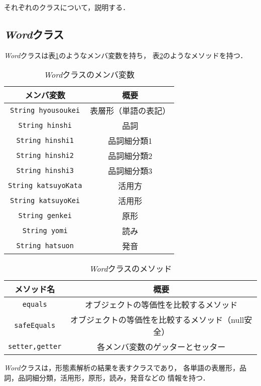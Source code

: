 \documentclass[a4paper,11pt,dvipdfmx]{jsarticle}
\begin{document}
それぞれのクラスについて，説明する．

\subsection{\textit{Word}クラス}
\textit{Word}クラスは表\ref{table:word_class_members}のようなメンバ変数を持ち，
表\ref{table:word_class_methods}のようなメソッドを持つ．

\begin{table}[H]
  \centering
  \caption{\textit{Word}クラスのメンバ変数}
  \label{table:word_class_members}
  \begin{tabular}{|c|c|}
    \hline
    メンバ変数 & 概要 \\
    \hline
    \texttt{String hyousoukei} & 表層形（単語の表記） \\
    \texttt{String hinshi} & 品詞 \\
    \texttt{String hinshi1} & 品詞細分類1 \\
    \texttt{String hinshi2} & 品詞細分類2 \\
    \texttt{String hinshi3} & 品詞細分類3 \\
    \texttt{String katsuyoKata} & 活用方 \\
    \texttt{String katsuyoKei} & 活用形 \\
    \texttt{String genkei} & 原形 \\
    \texttt{String yomi} & 読み \\
    \texttt{String hatsuon} & 発音 \\
  \hline
  \end{tabular}
\end{table}


\begin{table}[H]
\centering
\caption{\textit{Word}クラスのメソッド}
\label{table:word_class_methods}
\begin{tabular}{|c|c|}
\hline
メソッド名 & 概要 \\
\hline
\texttt{equals} & オブジェクトの等価性を比較するメソッド \\
\texttt{safeEquals} & オブジェクトの等価性を比較するメソッド（null安全） \\
\texttt{setter,getter} & 各メンバ変数のゲッターとセッター \\
\hline
\end{tabular}
\end{table}


\textit{Word}クラスは，形態素解析の結果を表すクラスであり，
各単語の表層形，品詞，品詞細分類，活用形，原形，読み，発音などの
情報を持つ．
\end{document}
